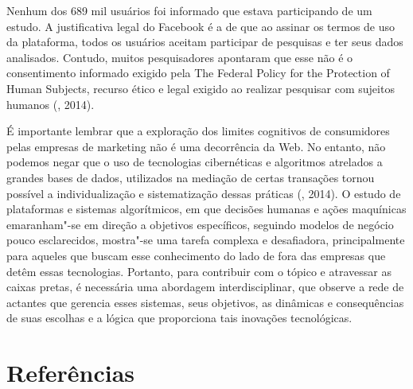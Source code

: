 Nenhum dos 689 mil usuários foi informado que estava participando de um
estudo. A justificativa legal do Facebook é a de que ao assinar os
termos de uso da plataforma, todos os usuários aceitam participar de
pesquisas e ter seus dados analisados. Contudo, muitos pesquisadores
apontaram que esse não é o consentimento informado exigido pela The
Federal Policy for the Protection of Human Subjects, recurso ético e
legal exigido ao realizar pesquisar com sujeitos humanos (, 2014).

É importante lembrar que a exploração dos limites cognitivos de
consumidores pelas empresas de marketing não é uma decorrência da Web.
No entanto, não podemos negar que o uso de tecnologias cibernéticas e
algoritmos atrelados a grandes bases de dados, utilizados na mediação de
certas transações tornou possível a individualização e sistematização
dessas práticas (, 2014). O estudo de plataformas e sistemas
algorítmicos, em que decisões humanas e ações maquínicas emaranham"-se em
direção a objetivos específicos, seguindo modelos de negócio pouco
esclarecidos, mostra"-se uma tarefa complexa e desafiadora,
principalmente para aqueles que buscam esse conhecimento do lado de fora
das empresas que detêm essas tecnologias. Portanto, para contribuir com
o tópico e atravessar as caixas pretas, é necessária uma abordagem
interdisciplinar, que observe a rede de actantes que gerencia esses
sistemas, seus objetivos, as dinâmicas e consequências de suas escolhas
e a lógica que proporciona tais inovações tecnológicas.

\section{Referências}

